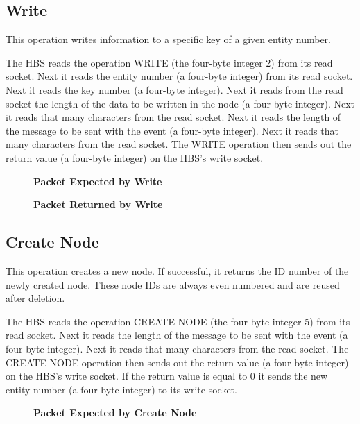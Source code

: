 \newpage
\subsection{Write}

This operation writes information to a specific key of a given entity
number.  

The HBS reads the operation WRITE (the four-byte integer 2) from its read
socket.  Next it reads the entity number (a four-byte integer) from its
read socket.  Next it reads the key number (a four-byte integer).  Next it
reads from the read socket the length of the data to be written in the node
(a four-byte integer).  Next it reads that many characters from the read
socket.  Next it reads the length of the message to be sent with the
event (a four-byte integer).  Next it reads that many characters from the
read socket.  The WRITE operation then sends out the return value (a
four-byte integer) on the HBS's write socket.

\begin{figure}[htb]
  \centerline{}
  \caption{{\bf Packet Expected by Write}}
  \label{fig:write1}
\end{figure}

\begin{figure}[htb]
  \centerline{}
  \caption{{\bf Packet Returned by Write}}
  \label{fig:write2}
\end{figure}


\newpage
\subsection{Create Node}

This operation creates a new node.  If successful, it returns the ID
number of the newly created node.  These node IDs are always even numbered
and are reused after deletion.  

The HBS reads the operation CREATE NODE (the four-byte integer 5) from its
read socket.  Next it reads the length of the message to be sent with
the event (a four-byte integer).  Next it reads that many characters from
the read socket.  The CREATE NODE operation then sends out the return
value (a four-byte integer) on the HBS's write socket.  If the return value
is equal to 0 it sends the new entity number (a four-byte integer) to its
write socket.

\begin{figure}[htb]
  \centerline{}
  \caption{{\bf Packet Expected by Create Node}}
  \label{fig:CreateNode1}
\end{figure}

